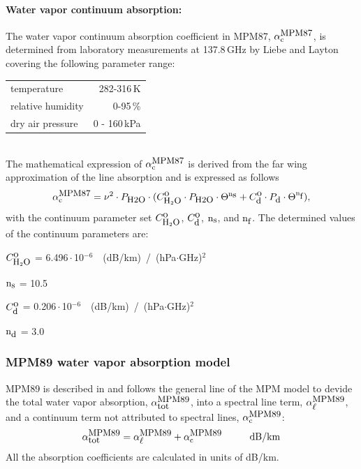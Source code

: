 \paragraph{Water vapor continuum absorption:}
\label{levele:mpm87_h2ocont}
The water vapor continuum absorption coefficient in MPM87, $\alpha^{\mbox{\rm \small MPM87}}_{\rm c}$, 
is determined from laboratory measurements at 137.8\,GHz by Liebe 
and Layton covering the following parameter range:\\
\begin{tabular}{lr}
temperature          & 282-316\,K\\
relative humidity    & 0-95\,\%\\
dry air pressure     & 0 - 160\,kPa\\ 
\end{tabular}\\
The mathematical expression of $\alpha^{\mbox{\rm \small MPM87}}_{\rm c}$ is derived from the far wing 
approximation of the line absorption and is expressed as follows
\begin{equation} 
  \label{eq:abs_theory:mpm87:cont}
  \alpha^{\mbox{\rm \small MPM87}}_{\rm c} = \nu^2 \cdot P_{\mbox{\rm \small H2O}} \cdot 
                (C^{\mbox{\rm o}}_{\mbox{\rm \small H}_{2}\mbox{\rm \small O}} \cdot P_{\mbox{\rm \small H2O}} \cdot \Theta^{{\rm n}_{\mbox{\rm \small s}}} + 
                 C^{\mbox{\rm o}}_{\mbox{\rm \small d}} \cdot P_{\mbox{\rm \small d}}  \cdot \Theta^{{\rm n}_{\mbox{\rm \small f}}}),
\end{equation}
with the continuum parameter set $C^{\mbox{\rm o}}_{\mbox{\rm \small H}_{2}\mbox{\rm \small O}}$, $C^{\mbox{\rm o}}_{\mbox{\rm \small d}}$, ${\rm n}_{\mbox{\rm \small s}}$, and ${\rm n}_{\mbox{\rm \small f}}$. 
The determined values of the continuum parameters are:

\begin{description}
\item{$C^{\mbox{\rm o}}_{\mbox{\rm \small H}_{2}\mbox{\rm \small O}}$}   =  6.496\,$\cdot$\,10$^{-6}$~~(dB/km)~/~(hPa$\cdot$GHz)$^2$
\item{${\rm n}_{\mbox{\rm \small s}}$}    = 10.5
\item{$C^{\mbox{\rm o}}_{\mbox{\rm \small d}}$}   =  0.206\,$\cdot$\,10$^{-6}$~~(dB/km)~/~(hPa$\cdot$GHz)$^2$
\item{${\rm n}_{\mbox{\rm \small d}}$}    =  3.0
\end{description}




\subsubsection{MPM89 water vapor absorption model}
\label{leveld:mpm89}
%
MPM89 is described in \citet{liebe:89} and follows the general line 
of the MPM model to devide the total water vapor absorption, 
$\alpha^{\mbox{\rm \small MPM89}}_{\mbox{\small tot}}$, into a spectral line term, $\alpha^{\mbox{\rm \small MPM89}}_{\mbox{\small $\ell$}}$, and a continuum 
term not attributed to spectral lines, $\alpha^{\mbox{\rm \small MPM89}}_{\rm c}$:
\begin{equation}
  \label{eq:abs_theory:mpm89_abs}
  \alphampmmtot = \alphampmml + \alphampmmc\hspace*{10mm}\mbox{dB/km}
\end{equation}
All the absorption coefficients are calculated in units of \mbox{dB/km}.


